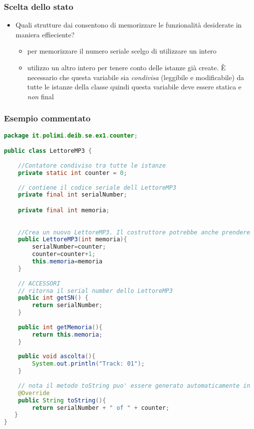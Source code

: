 \documentclass{article}
\begin{document}
\subsubsection{Scelta dello stato}
\begin{itemize}
\item Quali strutture dai consentono di memorizzare le funzionalit\`a desiderate in maniera effieciente?
\begin{itemize}
\item per memorizzare il numero seriale scelgo di utilizzare un intero
\item utilizzo un altro intero per tenere conto delle istanze gi\`a create. \`E necessario che questa variabile sia \emph{condivisa} (leggibile e modificabile) da tutte le istanze della classe quindi questa variabile deve essere statica e \emph{non} final
\end{itemize}
\end{itemize}



\subsubsection{Esempio commentato}
\begin{lstlisting}[language=Java,escapechar=|]
package it.polimi.deib.se.ex1.counter;

public class LettoreMP3 {
	
	//Contatore condiviso tra tutte le istanze
	private static int counter = 0;
	
	// contiene il codice seriale dell LettoreMP3
	private final int serialNumber;

    private final int memoria;	
	
	
	//Crea un nuovo LettoreMP3. Il costruttore potrebbe anche prendere come parametro un colore...
	public LettoreMP3(int memoria){
	    serialNumber=counter;
	    counter=counter+1;
	    this.memoria=memoria
	}
	
	// ACCESSORI
	// ritorna il serial number dello LettoreMP3
	public int getSN() {
		return serialNumber;
	}
    
    public int getMemoria(){
        return this.memoria;
    }
    
    public void ascolta(){
        System.out.println("Track: 01");
    }	
    
    // nota il metodo toString puo' essere generato automaticamente in eclipse sfruttando source > generateToString();
    @Override
    public String toString(){
        return serialNumber + " of " + counter;
   }
}
\end{lstlisting}
\end{document}
